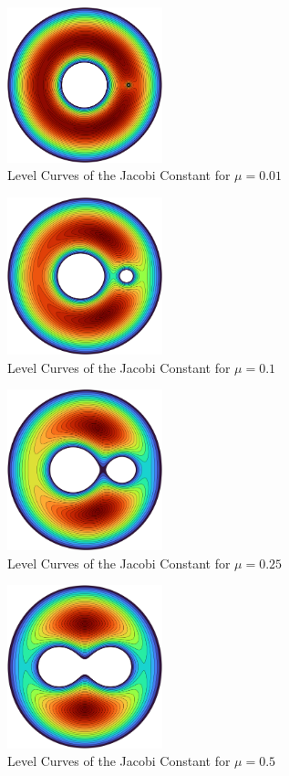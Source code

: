 \documentclass{article}
\begin{document}
\begin{figure}[H]
    \caption{Level Curves of the Jacobi Constant for $\mu=0.01$}
    \centering
    \includegraphics[width=0.4\textwidth]{level_curves/jacobi0.01.png}
\end{figure}
\begin{figure}[H]
    \caption{Level Curves of the Jacobi Constant for $\mu=0.1$}
    \centering
    \includegraphics[width=0.4\textwidth]{level_curves/jacobi0.1.png}
\end{figure}
\begin{figure}[H]
    \caption{Level Curves of the Jacobi Constant for $\mu=0.25$}
    \centering
    \includegraphics[width=0.4\textwidth]{level_curves/jacobi0.25.png}
\end{figure}
\begin{figure}[H]
    \caption{Level Curves of the Jacobi Constant for $\mu=0.5$}
    \centering
    \includegraphics[width=0.4\textwidth]{level_curves/jacobi0.5.png}
\end{figure}
\end{document}
